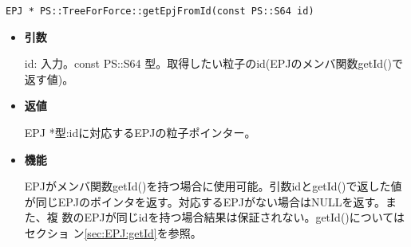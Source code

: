 \label{sec:getEpjFromId}

\begin{screen}
\begin{verbatim}
EPJ * PS::TreeForForce::getEpjFromId(const PS::S64 id)
\end{verbatim}
\end{screen}

\begin{itemize}

\item {\bf 引数}

id: 入力。const PS::S64 型。取得したい粒子のid(EPJのメンバ関数getId()で返す値)。

\item {\bf 返値}

EPJ *型:idに対応するEPJの粒子ポインター。

\item {\bf 機能}

EPJがメンバ関数getId()を持つ場合に使用可能。引数idとgetId()で返した値
が同じEPJのポインタを返す。対応するEPJがない場合はNULLを返す。また、複
数のEPJが同じidを持つ場合結果は保証されない。getId()についてはセクショ
ン\ref{sec:EPJ:getId}を参照。

\end{itemize}
